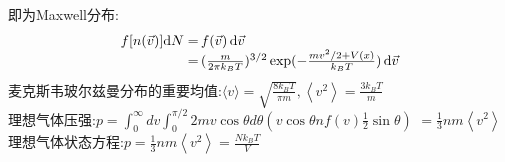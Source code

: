 \documentclass[UTF8,9pt]{ctexart}
\begin{document}
    即为Maxwell分布: 
    $$\ar{f[ n(\vec{v})]{\d N}\x f(\vec{v})\d \vec v \\
    \x(\f{m}{2\pi k_BT})^{3/2}\exp (-\f{mv^2/2+V(x)}{k_BT})\d \vec v}$$
    麦克斯韦玻尔兹曼分布的重要均值:$\langle v\rangle=\sqrt{\frac{8 k_{B} T}{\pi m}},\left\langle v^{2}\right\rangle=\frac{3 k_{B} T}{m}$\\
    理想气体压强:$p=\int_{0}^{\infty} d v \int_{0}^{\pi / 2} 2 m v \cos \theta d \theta\left(v \cos \theta n f(v) \frac{1}{2} \sin \theta\right)$
    $=\frac{1}{3} n m\left\langle v^{2}\right\rangle$\\
    理想气体状态方程:$p=\frac{1}{3} n m\left\langle v^{2}\right\rangle=\frac{N k_{B} T}{V}$
\end{document}

